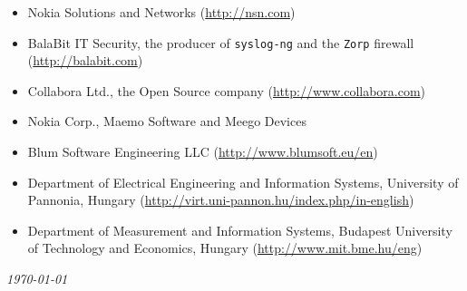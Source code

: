 \documentclass[a4paper,12pt]{article}
\newcommand{\compress}{\setlength\itemsep{-\parskip}}
\begin{document}
\begin{itemize}\compress
\item	Nokia Solutions and Networks (\url{http://nsn.com})
\item	BalaBit IT Security, the producer of \texttt{syslog-ng}
	and the \texttt{Zorp} firewall (\url{http://balabit.com})
\item	Collabora Ltd., the Open Source company (\url{http://www.collabora.com})
\item	Nokia Corp., Maemo Software and Meego Devices
\item	Blum Software Engineering LLC (\url{http://www.blumsoft.eu/en})
\item	Department of Electrical Engineering and Information Systems,
	University of Pannonia, Hungary
	(\url{http://virt.uni-pannon.hu/index.php/in-english})
\item	Department of Measurement and Information Systems,
	Budapest University of Technology and Economics, Hungary
	(\url{http://www.mit.bme.hu/eng})
\end{itemize}

\center\itshape\today
\end{document}
